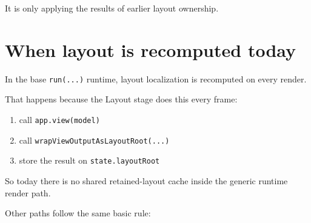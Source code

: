 It is only applying the results of earlier layout ownership.

\section{When layout is recomputed today}\label{record-049-when-layout-is-recomputed-today}

In the base \texttt{r\allowbreak{}u\allowbreak{}n\allowbreak{}(\allowbreak{}.\allowbreak{}.\allowbreak{}.\allowbreak{})} runtime, layout localization is recomputed on every render.

That happens because the Layout stage does this every frame:

\begin{enumerate}
\def\labelenumi{\arabic{enumi}.}
\tightlist
\item
  call \texttt{a\allowbreak{}p\allowbreak{}p\allowbreak{}.\allowbreak{}v\allowbreak{}i\allowbreak{}e\allowbreak{}w\allowbreak{}(\allowbreak{}m\allowbreak{}o\allowbreak{}d\allowbreak{}e\allowbreak{}l\allowbreak{})}
\item
  call \texttt{w\allowbreak{}r\allowbreak{}a\allowbreak{}p\allowbreak{}V\allowbreak{}i\allowbreak{}e\allowbreak{}w\allowbreak{}O\allowbreak{}u\allowbreak{}t\allowbreak{}p\allowbreak{}u\allowbreak{}t\allowbreak{}A\allowbreak{}s\allowbreak{}L\allowbreak{}a\allowbreak{}y\allowbreak{}o\allowbreak{}u\allowbreak{}t\allowbreak{}R\allowbreak{}o\allowbreak{}o\allowbreak{}t\allowbreak{}(\allowbreak{}.\allowbreak{}.\allowbreak{}.\allowbreak{})}
\item
  store the result on \texttt{s\allowbreak{}t\allowbreak{}a\allowbreak{}t\allowbreak{}e\allowbreak{}.\allowbreak{}l\allowbreak{}a\allowbreak{}y\allowbreak{}o\allowbreak{}u\allowbreak{}t\allowbreak{}R\allowbreak{}o\allowbreak{}o\allowbreak{}t}
\end{enumerate}

So today there is no shared retained-layout cache inside the generic runtime render path.

Other paths follow the same basic rule:

